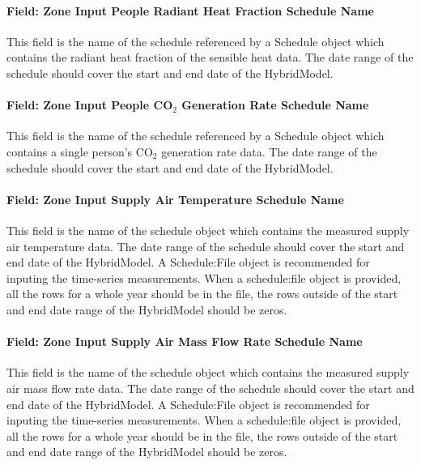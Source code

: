 \paragraph{Field: Zone Input People Radiant Heat Fraction Schedule Name}\label{field-zone-input-people-radiant-heat-fraction-schedule-name-hm}

This field is the name of the schedule referenced by a Schedule object which contains the radiant heat fraction of the sensible heat data. The date range of the schedule should cover the start and end date of the HybridModel.

\paragraph{Field: Zone Input People CO$_2$ Generation Rate Schedule Name}\label{field-zone-input-people-co2-generation-rate-schedule-name-hm}

This field is the name of the schedule referenced by a Schedule object which contains a single person's CO$_2$ generation rate data. The date range of the schedule should cover the start and end date of the HybridModel.

\paragraph{Field: Zone Input Supply Air Temperature Schedule Name}\label{field-zone-input-supply-air-temperature-schedule-name-hm}

This field is the name of the schedule object which contains the measured supply air temperature data. The date range of the schedule should cover the start and end date of the HybridModel. A Schedule:File object is recommended for inputing the time-series measurements. When a schedule:file object is provided, all the rows for a whole year should be in the file, the rows outside of the start and end date range of the HybridModel should be zeros.

\paragraph{Field: Zone Input Supply Air Mass Flow Rate Schedule Name}\label{field-zone-input-supply-air-mass-flow-rate-schedule-name-hm}

This field is the name of the schedule object which contains the measured supply air mass flow rate data. The date range of the schedule should cover the start and end date of the HybridModel. A Schedule:File object is recommended for inputing the time-series measurements. When a schedule:file object is provided, all the rows for a whole year should be in the file, the rows outside of the start and end date range of the HybridModel should be zeros.


